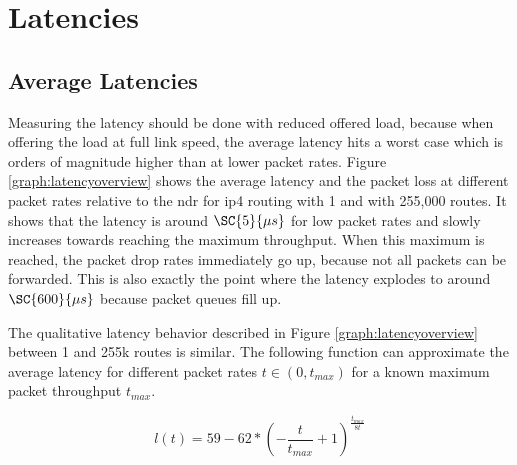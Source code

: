 

\section{Latencies}

\subsection{Average Latencies}


Measuring the latency should be done with reduced offered load,
because when offering the load at full link speed, the average latency
hits a worst case which is orders of magnitude higher than at lower
packet rates. Figure \ref{graph:latencyoverview} shows the average
latency and the packet loss at different packet rates relative to the
\Ac{ndr} for \Ac{ip4} routing with 1 and with 255,000 routes. It shows
that the latency is around $\SC{5}{\mu s}$ for low packet rates and
slowly increases towards reaching the maximum throughput. When this
maximum is reached, the packet drop rates immediately go up, because
not all packets can be forwarded. This is also exactly the point where
the latency explodes to around $\SC{600}{\mu s}$ because packet queues
fill up.

The qualitative latency behavior described in Figure
\ref{graph:latencyoverview} between 1 and 255k routes is similar. The
following function can approximate the average latency for different
packet rates $t \in (0, t_{max})$ for a known maximum packet
throughput $t_{max}$. 

$$ l(t) = 59 - 62 * (-\frac{t}{t_{max}}+1)^{\frac{t_{max}}{8t}} $$ 



